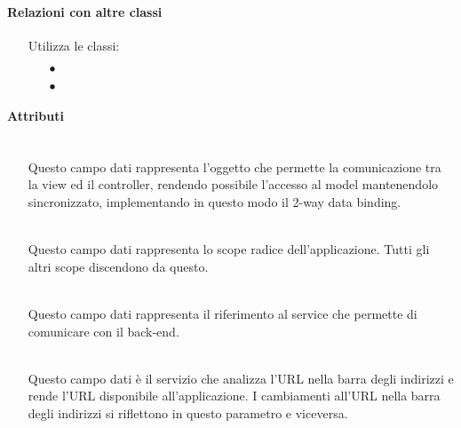\paragraph*{Relazioni con altre classi}
\begin{itemize}


\item[] Utilizza le classi:
\begin{itemize}
\item[$\bullet$] 
\item[$\bullet$] 
\end{itemize}
\end{itemize}

\paragraph*{Attributi}
\begin{itemize}
\item[]  \\ Questo campo dati rappresenta l'oggetto che permette la comunicazione tra la view ed il controller, rendendo possibile l’accesso al model mantenendolo sincronizzato, implementando in questo modo il 2-way data binding.
\item[]  \\ Questo campo dati rappresenta lo scope radice dell'applicazione. Tutti gli altri scope discendono da questo.
\item[]  \\ Questo campo dati rappresenta il riferimento al service che permette di comunicare con il back-end.
\item[]  \\ Questo campo dati è il servizio che analizza l'URL nella barra degli indirizzi e rende l'URL disponibile all'applicazione. I cambiamenti all'URL nella barra degli indirizzi si riflettono in questo parametro e viceversa.
\end{itemize}

